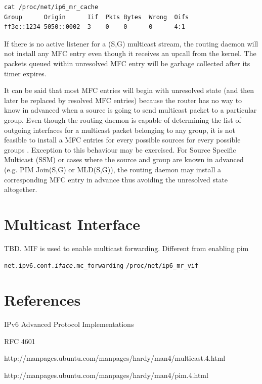 \documentclass{article}
\begin{document}
\begin{lstlisting}
cat /proc/net/ip6_mr_cache
Group      Origin      Iif  Pkts Bytes  Wrong  Oifs
ff3e::1234 5050::0002  3    0    0      0      4:1
\end{lstlisting}

If there is no active listener for a (S,G) multicast stream, the routing daemon
will not install any MFC entry even though it receives an upcall from the
kernel. The packets queued within unresolved MFC entry will be garbage collected
after its timer expires.

It can be said that most MFC entries will begin with unresolved state (and then
later be replaced by resolved MFC entries) because the router has no way to know
in advanced when a source is going to send multicast packet to a particular
group. Even though the routing daemon is capable of determining the list of
outgoing interfaces for a multicast packet belonging to any group, it is not
feasible to install a MFC entries for every possible sources for every possible
groups . Exception to this behaviour may be exercised. For Source Specific
Multicast (SSM) or cases where the source and group are known in advanced (e.g.
PIM Join(S,G) or MLD(S,G)), the routing daemon may install a corresponding MFC
entry in advance thus avoiding the unresolved state altogether.

\section{Multicast Interface}
TBD. MIF is used to enable multicast forwarding. Different from enabling pim

\texttt{net.ipv6.conf.\textit{iface}.mc\_forwarding}
\texttt{/proc/net/ip6\_mr\_vif}

\section{References}
IPv6 Advanced Protocol Implementations

RFC 4601

http://manpages.ubuntu.com/manpages/hardy/man4/multicast.4.html

http://manpages.ubuntu.com/manpages/hardy/man4/pim.4.html
\end{document}
